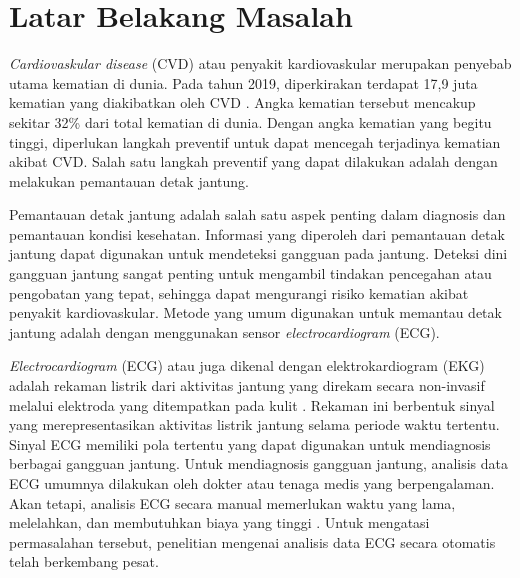 
\section{Latar Belakang Masalah}

\emph{Cardiovaskular disease} (CVD) atau penyakit kardiovaskular merupakan penyebab utama kematian di dunia.
Pada tahun 2019, diperkirakan terdapat 17,9 juta kematian yang diakibatkan oleh CVD \parencite{worldhealthorganizationCardiovascularDiseasesCVDs2021}.
Angka kematian tersebut mencakup sekitar 32\% dari total kematian di dunia. 
Dengan angka kematian yang begitu tinggi, diperlukan langkah preventif untuk dapat mencegah terjadinya kematian akibat CVD.
Salah satu langkah preventif yang dapat dilakukan adalah dengan melakukan pemantauan detak jantung.

Pemantauan detak jantung adalah salah satu aspek penting dalam diagnosis dan pemantauan kondisi kesehatan.
Informasi yang diperoleh dari pemantauan detak jantung dapat digunakan untuk mendeteksi gangguan pada jantung.
Deteksi dini gangguan jantung sangat penting untuk mengambil tindakan pencegahan atau pengobatan yang tepat, sehingga dapat mengurangi risiko kematian akibat penyakit kardiovaskular.
Metode yang umum digunakan untuk memantau detak jantung adalah dengan menggunakan sensor \emph{electrocardiogram} (ECG).


\textit{Electrocardiogram} (ECG) atau juga dikenal dengan elektrokardiogram (EKG) adalah rekaman listrik dari aktivitas jantung yang direkam secara non-invasif melalui elektroda yang ditempatkan pada kulit \parencite{sattarElectrocardiogram2024}.
Rekaman ini berbentuk sinyal yang merepresentasikan aktivitas listrik jantung selama periode waktu tertentu.
Sinyal ECG memiliki pola tertentu yang dapat digunakan untuk mendiagnosis berbagai gangguan jantung.
Untuk mendiagnosis gangguan jantung, analisis data ECG umumnya dilakukan oleh dokter atau tenaga medis yang berpengalaman.
Akan tetapi, analisis ECG secara manual memerlukan waktu yang lama, melelahkan, dan membutuhkan biaya yang tinggi \parencite{anbalaganAnalysisVariousTechniques2023}.
Untuk mengatasi permasalahan tersebut, penelitian mengenai analisis data ECG secara otomatis telah berkembang pesat.

